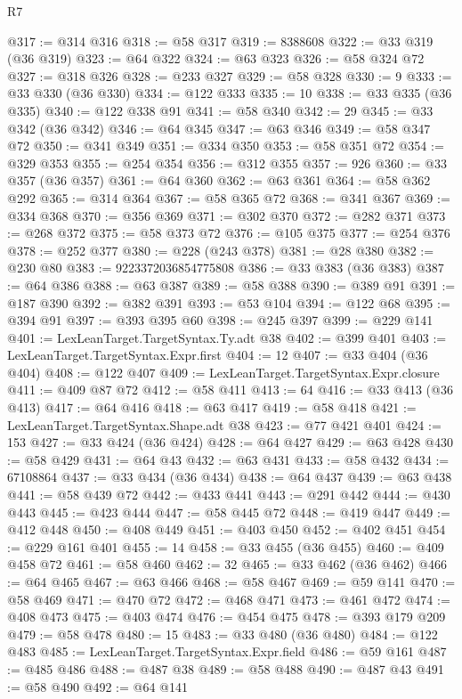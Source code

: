 \begin{lexlean}{R7}
\begin{coremodule}
@317 := @314 @316
@318 := @58 @317
@319 := 8388608
@322 := @33 @319 (@36 @319)
@323 := @64 @322
@324 := @63 @323
@326 := @58 @324 @72
@327 := @318 @326
@328 := @233 @327
@329 := @58 @328
@330 := 9
@333 := @33 @330 (@36 @330)
@334 := @122 @333
@335 := 10
@338 := @33 @335 (@36 @335)
@340 := @122 @338 @91
@341 := @58 @340
@342 := 29
@345 := @33 @342 (@36 @342)
@346 := @64 @345
@347 := @63 @346
@349 := @58 @347 @72
@350 := @341 @349
@351 := @334 @350
@353 := @58 @351 @72
@354 := @329 @353
@355 := @254 @354
@356 := @312 @355
@357 := 926
@360 := @33 @357 (@36 @357)
@361 := @64 @360
@362 := @63 @361
@364 := @58 @362 @292
@365 := @314 @364
@367 := @58 @365 @72
@368 := @341 @367
@369 := @334 @368
@370 := @356 @369
@371 := @302 @370
@372 := @282 @371
@373 := @268 @372
@375 := @58 @373 @72
@376 := @105 @375
@377 := @254 @376
@378 := @252 @377
@380 := @228 (@243 @378)
@381 := @28 @380
@382 := @230 @80
@383 := 9223372036854775808
@386 := @33 @383 (@36 @383)
@387 := @64 @386
@388 := @63 @387
@389 := @58 @388
@390 := @389 @91
@391 := @187 @390
@392 := @382 @391
@393 := @53 @104
@394 := @122 @68
@395 := @394 @91
@397 := @393 @395 @60
@398 := @245 @397
@399 := @229 @141
@401 := LexLeanTarget.TargetSyntax.Ty.adt @38
@402 := @399 @401
@403 := LexLeanTarget.TargetSyntax.Expr.first
@404 := 12
@407 := @33 @404 (@36 @404)
@408 := @122 @407
@409 := LexLeanTarget.TargetSyntax.Expr.closure
@411 := @409 @87 @72
@412 := @58 @411
@413 := 64
@416 := @33 @413 (@36 @413)
@417 := @64 @416
@418 := @63 @417
@419 := @58 @418
@421 := LexLeanTarget.TargetSyntax.Shape.adt @38
@423 := @77 @421 @401
@424 := 153
@427 := @33 @424 (@36 @424)
@428 := @64 @427
@429 := @63 @428
@430 := @58 @429
@431 := @64 @43
@432 := @63 @431
@433 := @58 @432
@434 := 67108864
@437 := @33 @434 (@36 @434)
@438 := @64 @437
@439 := @63 @438
@441 := @58 @439 @72
@442 := @433 @441
@443 := @291 @442
@444 := @430 @443
@445 := @423 @444
@447 := @58 @445 @72
@448 := @419 @447
@449 := @412 @448
@450 := @408 @449
@451 := @403 @450
@452 := @402 @451
@454 := @229 @161 @401
@455 := 14
@458 := @33 @455 (@36 @455)
@460 := @409 @458 @72
@461 := @58 @460
@462 := 32
@465 := @33 @462 (@36 @462)
@466 := @64 @465
@467 := @63 @466
@468 := @58 @467
@469 := @59 @141
@470 := @58 @469
@471 := @470 @72
@472 := @468 @471
@473 := @461 @472
@474 := @408 @473
@475 := @403 @474
@476 := @454 @475
@478 := @393 @179 @209
@479 := @58 @478
@480 := 15
@483 := @33 @480 (@36 @480)
@484 := @122 @483
@485 := LexLeanTarget.TargetSyntax.Expr.field
@486 := @59 @161
@487 := @485 @486
@488 := @487 @38
@489 := @58 @488
@490 := @487 @43
@491 := @58 @490
@492 := @64 @141

\end{coremodule}
\end{lexlean}
